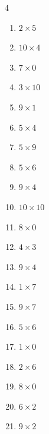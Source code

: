 \begin{multicols}{4}
\begin{enumerate}
  \item $2\times 5$
        \phantom{$=10$}

  \item $10\times 4$
        \phantom{$=40$}

  \item $7\times 0$
        \phantom{$=0$}

  \item $3\times 10$
        \phantom{$=30$}

  \item $9\times 1$
        \phantom{$=9$}

  \item $5\times 4$
        \phantom{$=20$}

  \item $5\times 9$
        \phantom{$=45$}

  \item $5\times 6$
        \phantom{$=30$}

  \item $9\times 4$
        \phantom{$=36$}

  \item $10\times 10$
        \phantom{$=100$}

  \item $8\times 0$
        \phantom{$=0$}

  \item $4\times 3$
        \phantom{$=12$}

  \item $9\times 4$
        \phantom{$=36$}

  \item $1\times 7$
        \phantom{$=7$}

  \item $9\times 7$
        \phantom{$=63$}

  \item $5\times 6$
        \phantom{$=30$}

  \item $1\times 0$
        \phantom{$=0$}

  \item $2\times 6$
        \phantom{$=12$}

  \item $8\times 0$
        \phantom{$=0$}

  \item $6\times 2$
        \phantom{$=12$}

  \item $9\times 2$
        \phantom{$=18$}


\end{enumerate}
\end{multicols}
